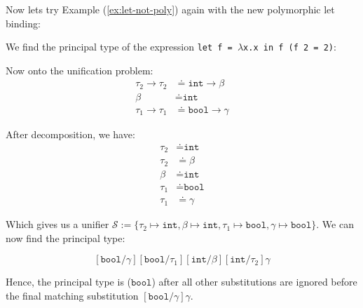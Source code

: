 \noindent
Now lets try Example (\ref{ex:let-not-poly}) again with the new polymorphic let binding:
\begin{Example}

    \noindent
    We find the principal type of the expression \texttt{let f = $\lambda$x.x in f (f\ 2 = 2)}:

    \vspace{1em}
\Large
{}
\normalsize

\vspace{1em}
  
\noindent
Now onto the unification problem:
\begin{align*}
    \tau_2\to\tau_2 &\doteq \texttt{int}\to\beta\\
    \beta &\doteq \texttt{int}\\
    \tau_1\to\tau_1 &\doteq \texttt{bool}\to\gamma
\end{align*}

\noindent
After decomposition, we have:
\begin{align*}
    \tau_2&\doteq\texttt{int}\\
    \tau_2 &\doteq \beta\\
    \beta &\doteq \texttt{int}\\
    \tau_1&\doteq\texttt{bool}\\
    \tau_1 &\doteq \gamma
\end{align*}

\noindent
Which gives us a unifier $\mathcal{S}:=\{\tau_2\mapsto\texttt{int},\beta\mapsto\texttt{int},\tau_1\mapsto\texttt{bool},\gamma\mapsto\texttt{bool}\}$. We can now find the principal type:

\[
[\texttt{bool}/\gamma][\texttt{bool}/\tau_1][\texttt{int}/\beta][\texttt{int}/\tau_2]\gamma
\]

\noindent
Hence, the principal type is ($\texttt{bool}$) after all other substitutions are ignored before the final matching substitution
$[\texttt{bool}/\gamma]\gamma$.
\end{Example}

